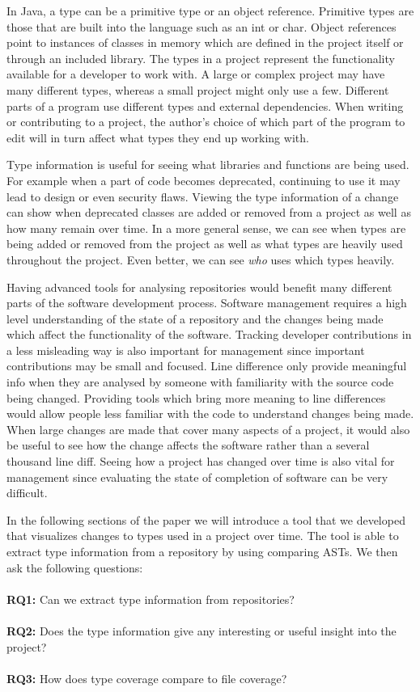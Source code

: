 \documentclass[conference]{IEEEtran}
\begin{document}
In Java, a type can be a primitive type or an object reference. Primitive types are those that are built into the language such as an int or char. Object references point to instances of classes in memory which are defined in the project itself or through an included library. The types in a project represent the functionality available for a developer to work with. A large or complex project may have many different types, whereas a small project might only use a few. Different parts of a program use different types and external dependencies. When writing or contributing to a project, the author’s choice of which part of the program to edit will in turn affect what types they end up working with.

Type information is useful for seeing what libraries and functions are being used.  For example when a part of code becomes deprecated, continuing to use it may lead to design or even security flaws. Viewing the type information of a change can show when deprecated classes are added or removed from a project as well as how many remain over time. In a more general sense, we can see when types are being added or removed from the project as well as what types are heavily used throughout the project. Even better, we can see \emph{who} uses which types heavily.

Having advanced tools for analysing repositories would benefit many different parts of the software development process. Software management requires a high level understanding of the state of a repository and the changes being made which affect the functionality of the software. Tracking developer contributions in a less misleading way is also important for management since important contributions may be small and focused. Line difference only provide meaningful info when they are analysed by someone with familiarity with the source code being changed. Providing tools which bring more meaning to line differences would allow people less familiar with the code to understand changes being made. When large changes are made that cover many aspects of a project, it would also be useful to see how the change affects the software rather than a several thousand line diff.  Seeing how a project has changed over time is also vital for management since evaluating the state of completion of software can be very difficult.

In the following sections of the paper we will introduce a tool that we developed that visualizes changes to types used in a project over time. The tool is able to extract type information from a repository by using comparing ASTs. We then ask the following questions: 
\\ \\
\textbf{RQ1:} Can we extract type information from repositories? \\ \\
\textbf{RQ2:} Does the type information give any interesting or useful insight into the project? \\ \\
\textbf{RQ3:} How does type coverage compare to file coverage?
\end{document}

